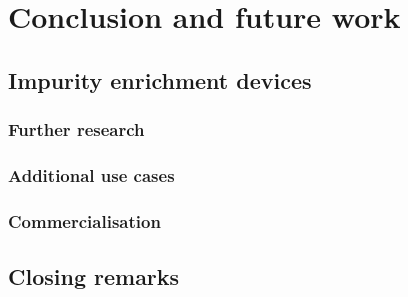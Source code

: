 \chapter{Conclusion and future work}

\section{Impurity enrichment devices}
\subsection{Further research}
\subsection{Additional use cases}
\subsection{Commercialisation}

\section{Closing remarks}



% 
% 